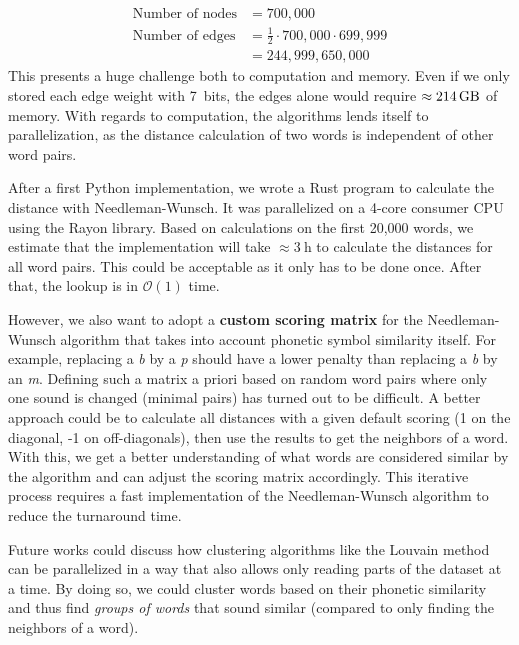 \begin{multicols*}{2}
\begin{align}
    \text{Number of nodes} &= 700,000 \\
    \text{Number of edges} &= \frac{1}{2} \cdot 700,000 \cdot 699,999 \\
    &=  244,999,650,000
\end{align}
This presents a huge challenge both to computation and memory. Even if we only stored each edge weight with 7~bits, the edges alone would require $\approx \qty{214}{\giga\byte}$ of memory. With regards to computation, the algorithms lends itself to parallelization, as the distance calculation of two words is independent of other word pairs.

After a first Python implementation, we wrote a Rust program to calculate the distance with Needleman-Wunsch. It was parallelized on a 4-core consumer CPU using the Rayon library. Based on calculations on the first 20,000 words, we estimate that the implementation will take $\approx \qty{3}{\hour}$ to calculate the distances for all word pairs. This could be acceptable as it only has to be done once. After that, the lookup is in $\mathcal{O}(1)$ time.

However, we also want to adopt a \textbf{custom scoring matrix} for the Needleman-Wunsch algorithm that takes into account phonetic symbol similarity itself. For example, replacing a \textit{b} by a \textit{p} should have a lower penalty than replacing a \textit{b} by an \textit{m}. Defining such a matrix a priori based on random word pairs where only one sound is changed (minimal pairs) has turned out to be difficult. A better approach could be to calculate all distances with a given default scoring (1 on the diagonal, -1 on off-diagonals), then use the results to get the neighbors of a word. With this, we get a better understanding of what words are considered similar by the algorithm and can adjust the scoring matrix accordingly. This iterative process requires a fast implementation of the Needleman-Wunsch algorithm to reduce the turnaround time.

Future works could discuss how clustering algorithms like the Louvain method can be parallelized in a way that also allows only reading parts of the dataset at a time. By doing so, we could cluster words based on their phonetic similarity and thus find \textit{groups of words} that sound similar (compared to only finding the neighbors of a word).

\end{multicols*}


